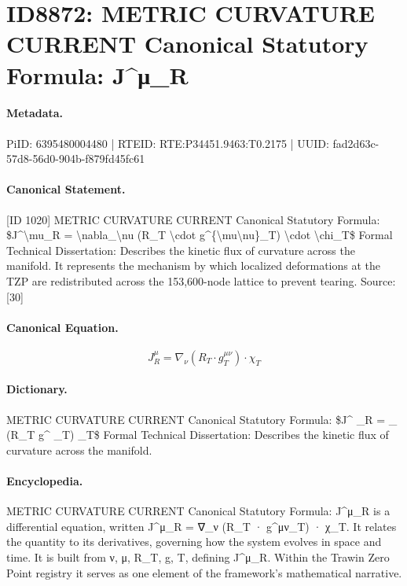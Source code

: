 \section*{ID8872: METRIC CURVATURE CURRENT Canonical Statutory Formula: J\textasciicircum{}μ\_R}
\paragraph{Metadata.}
PiID: 6395480004480 | RTEID: RTE:P34451.9463:T0.2175 | UUID: fad2d63c-57d8-56d0-904b-f879fd45fc61

\paragraph{Canonical Statement.}
[ID 1020] METRIC CURVATURE CURRENT Canonical Statutory Formula: \$J\textasciicircum{}\textbackslash{}mu\_R = \textbackslash{}nabla\_\textbackslash{}nu (R\_T \textbackslash{}cdot g\textasciicircum{}\{\textbackslash{}mu\textbackslash{}nu\}\_T) \textbackslash{}cdot \textbackslash{}chi\_T\$ Formal Technical Dissertation: Describes the kinetic flux of curvature across the manifold. It represents the mechanism by which localized deformations at the TZP are redistributed across the 153,600-node lattice to prevent tearing. Source: [30]

\paragraph{Canonical Equation.}
\[
J^\mu_R = \nabla_\nu (R_T \cdot g^{\mu\nu}_T) \cdot \chi_T
\]

\paragraph{Dictionary.}
METRIC CURVATURE CURRENT Canonical Statutory Formula: \$J\textasciicircum{} \_R = \_ (R\_T g\textasciicircum{} \_T) \_T\$ Formal Technical Dissertation: Describes the kinetic flux of curvature across the manifold.

\paragraph{Encyclopedia.}
METRIC CURVATURE CURRENT Canonical Statutory Formula: J\textasciicircum{}μ\_R is a differential equation, written J\textasciicircum{}μ\_R = ∇\_ν (R\_T · g\textasciicircum{}μν\_T) · χ\_T. It relates the quantity to its derivatives, governing how the system evolves in space and time. It is built from ν, μ, R\_T, g, T, defining J\textasciicircum{}μ\_R. Within the Trawin Zero Point registry it serves as one element of the framework's mathematical narrative.
